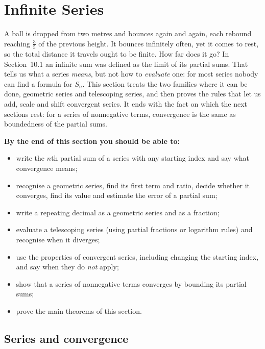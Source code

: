 \documentclass[11pt]{article}
\begin{document}
\section{Infinite Series}

\begin{guide}
A ball is dropped from two metres and bounces again and again, each rebound reaching $\frac35$ of the previous height. It bounces infinitely often, yet it comes to rest, so the total distance it travels ought to be finite. How far does it go? In Section~10.1 an infinite sum was defined as the limit of its partial sums. That tells us what a series \emph{means}, but not how to \emph{evaluate} one: for most series nobody can find a formula for $S_n$. This section treats the two families where it can be done, geometric series and telescoping series, and then proves the rules that let us add, scale and shift convergent series. It ends with the fact on which the next sections rest: for a series of nonnegative terms, convergence is the same as boundedness of the partial sums.
\end{guide}

\textbf{By the end of this section you should be able to:}
\begin{itemize}
  \item write the $n$th partial sum of a series with any starting index and say what convergence means;
  \item recognise a geometric series, find its first term and ratio, decide whether it converges, find its value and estimate the error of a partial sum;
  \item write a repeating decimal as a geometric series and as a fraction;
  \item evaluate a telescoping series (using partial fractions or logarithm rules) and recognise when it diverges;
  \item use the properties of convergent series, including changing the starting index, and say when they do \emph{not} apply;
  \item show that a series of nonnegative terms converges by bounding its partial sums;
  \item prove the main theorems of this section.
\end{itemize}

\subsection*{Series and convergence}
\end{document}
